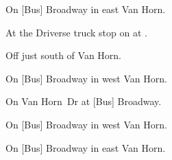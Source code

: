 

\begin{LocationList}

On [Bus] Broadway in east Van Horn.

At the Driverse truck stop on  at .

Off  just south of Van Horn.

On [Bus] Broadway in west Van Horn.

On  Van Horn~Dr at [Bus] Broadway.

On [Bus] Broadway in west Van Horn.

\Location{\TruckService \Service}
On [Bus] Broadway in east Van Horn.

\end{LocationList}
